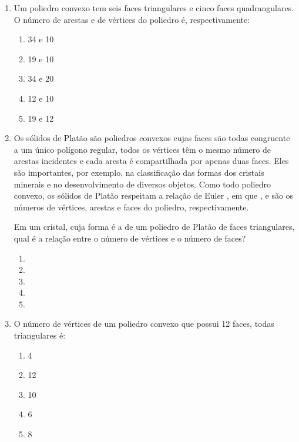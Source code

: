\documentclass[twocolumn,oneside,a4paper,12pt]{article}
\begin{document}
\begin{enumerate}
\begin{enumerate}
\item \m{3\pi}
\item \m{12\pi}
\item \m{36\pi}
\item \m{64\pi}
\item \m{108\pi}
\end{enumerate}

\item  Um poliedro convexo tem seis faces triangulares e cinco faces quadrangulares. O número de arestas e de vértices do poliedro é, respectivamente:
\begin{enumerate}
\item 34 e 10
\item 19 e 10
\item 34 e 20
\item 12 e 10
\item 19 e 12
\end{enumerate}

\item Os sólidos de Platão são poliedros convexos cujas faces são todas congruente a  um único polígono regular, todos os vértices têm o mesmo número de arestas incidentes e cada aresta é compartilhada por apenas duas faces. Eles são importantes, por exemplo, na classificação das formas dos cristais minerais e no desenvolvimento de diversos objetos. Como todo poliedro convexo, os sólidos de Platão respeitam a relação de Euler , em que ,  e  são os números de vértices, arestas e faces do poliedro, respectivamente.

Em um cristal, cuja forma é a de um poliedro de Platão de faces triangulares, qual é a relação entre o número de vértices e o número de faces?

\begin{enumerate}
\item {}
\item {}
\item {}
\item {}
\item {}
\end{enumerate}

\item O número de vértices de um poliedro convexo que possui 12 faces, todas triangulares é:
\begin{enumerate}
\item 4
\item 12
\item 10
\item 6
\item 8 
\end{enumerate}


\end{enumerate}
\end{document}
